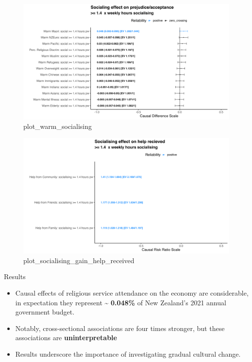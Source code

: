 \documentclass[
  ignorenonframetext,
  aspectratio=169,
]{beamer}
\providecommand{\tightlist}{%
  \setlength{\itemsep}{0pt}\setlength{\parskip}{0pt}}\usepackage{longtable,booktabs,array}
\begin{document}
\begin{frame}
\begin{figure}[H]

{\centering \includegraphics{plot_warm_socialising.png}

}

\caption{plot\_warm\_socialising}

\end{figure}%
\end{frame}

\begin{frame}
\begin{figure}[H]

{\centering \includegraphics{plot_socialising_gain_help_received.png}

}

\caption{plot\_socialising\_gain\_help\_received}

\end{figure}%
\end{frame}

\begin{frame}{Results}
\label{results}
\begin{itemize}
\tightlist
\item
  Causal effects of religious service attendance on the economy are
  considerable, in expectation they represent \textasciitilde{}
  \textbf{0.048\%} of New Zealand's 2021 annual government budget.
\item
  Notably, cross-sectional associations are four times stronger, but
  these associations are \textbf{uninterpretable}
\item
  Results underscore the importance of investigating gradual cultural
  change.
\end{itemize}
\end{frame}
\end{document}

